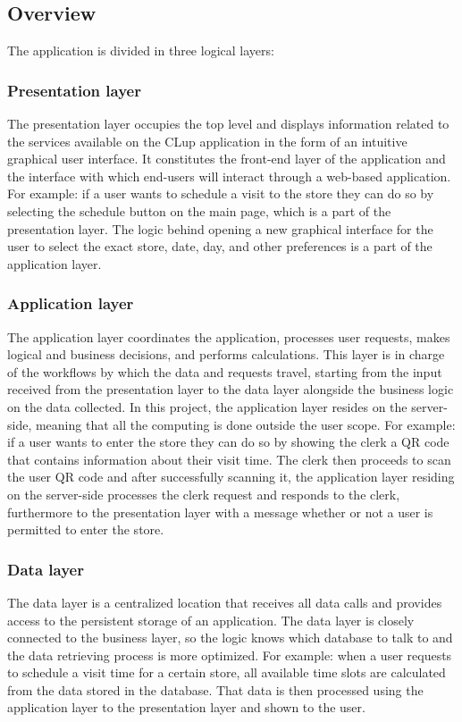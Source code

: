 \subsection{Overview}
The application is divided in three logical layers:
\subsubsection{Presentation layer}
The presentation layer occupies the top level and displays information related to the services available on the CLup application in the form of an intuitive graphical user interface.
It constitutes the front-end layer of the application and the interface with which end-users will interact through a web-based application.
For example: if a user wants to schedule a visit to the store they can do so by selecting the schedule button on the main page, which is a part of the presentation layer.
The logic behind opening a new graphical interface for the user to select the exact store, date, day, and other preferences is a part of the application layer.
\subsubsection{Application layer}
The application layer coordinates the application, processes user requests, makes logical and business decisions, and performs calculations.
This layer is in charge of the workflows by which the data and requests travel, starting from the input received from the presentation layer
to the data layer alongside the business logic on the data collected.
In this project, the application layer resides on the server-side, meaning that all the computing is done outside the user scope.
For example: if a user wants to enter the store they can do so by showing the clerk a QR code that contains information about their visit time.
The clerk then proceeds to scan the user QR code and after successfully scanning it, the application layer residing on the server-side processes
the clerk request and responds to the clerk, furthermore to the presentation layer with a message whether or not a user is permitted to enter the store.
\subsubsection{Data layer}
The data layer is a centralized location that receives all data calls and provides access to the persistent storage of an application.
The data layer is closely connected to the business layer, so the logic knows which database to talk to and the data retrieving process is more optimized.
For example: when a user requests to schedule a visit time for a certain store, all available time slots are calculated from the data stored in the database.
That data is then processed using the application layer to the presentation layer and shown to the user.

